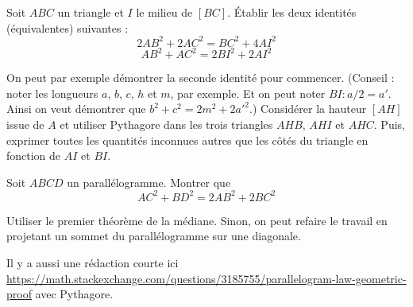 \begin{exo}
Soit $ABC$ un triangle et $I$ le milieu de $[BC]$.
Établir les deux identités (équivalentes) suivantes :
\[ 2AB^2+2AC^2 = BC^2+4AI^2\]
\[ AB^2+AC^2 = 2BI^2+2AI^2\]
\begin{center}
\end{center}
\begin{hint}
On peut par exemple démontrer la seconde identité pour commencer.
(Conseil : noter les longueurs $a$, $b$, $c$, $h$ et $m$, par exemple. Et on peut noter $BI : a/2 = a'$. Ainsi on veut démontrer 
 que $b^2+c^2 = 2m^2+2a'^2$.)
Considérer la hauteur $[AH]$ issue de $A$ et utiliser Pythagore dans les trois triangles $AHB$, $AHI$ et $AHC$. Puis, exprimer toutes les quantités inconnues autres que les côtés du triangle en fonction de $AI$ et $BI$. 
\end{hint}
\end{exo}


\begin{exo}
Soit $ABCD$ un parallélogramme.
Montrer que
\[ AC^2+BD^2 = 2AB^2+2BC^2\]
\begin{center}
\begin{tikzpicture}
\end{tikzpicture}
\end{center}
\begin{hint}
Utiliser le premier théorème de la médiane. Sinon, on peut refaire le travail en projetant un sommet du parallélogramme sur une diagonale.
\end{hint}
\begin{sol}
Il y a aussi une rédaction courte ici \url{https://math.stackexchange.com/questions/3185755/parallelogram-law-geometric-proof} avec Pythagore.
\end{sol}
\end{exo}


